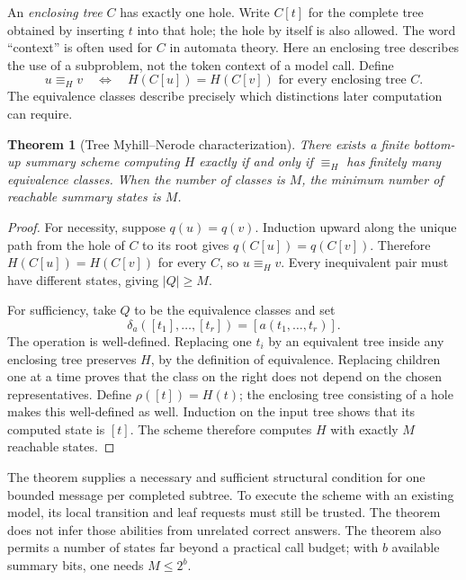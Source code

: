 \documentclass[11pt,twoside]{article}
\newtheorem{theorem}{Theorem}[section]
\theoremstyle{definition}
\theoremstyle{remark}
\begin{document}
An \emph{enclosing tree} $C$ has exactly one hole. Write $C[t]$ for the
complete tree obtained by inserting $t$ into that hole; the hole by itself
is also allowed. The word ``context'' is often used for $C$ in automata
theory. Here an enclosing tree describes the use of a subproblem, not the
token context of a model call. Define
\begin{equation}
 u\equiv_H v
 \quad\Longleftrightarrow\quad
 H(C[u])=H(C[v])\text{ for every enclosing tree }C.
 \label{eq:tree-equivalence}
\end{equation}
The equivalence classes describe precisely which distinctions later
computation can require.

\begin{theorem}[Tree Myhill--Nerode characterization]
\label{thm:tree-mn}
There exists a finite bottom-up summary scheme computing $H$ exactly if and only if
$\equiv_H$ has finitely many equivalence classes. When the number of
classes is $M$, the minimum number of reachable summary states is $M$.
\end{theorem}
\begin{proof}
For necessity, suppose $q(u)=q(v)$. Induction upward along the unique path
from the hole of $C$ to its root gives $q(C[u])=q(C[v])$. Therefore
$H(C[u])=H(C[v])$ for every $C$, so $u\equiv_H v$.
Every inequivalent pair must have different states, giving $|Q|\geq M$.

For sufficiency, take $Q$ to be the equivalence classes and set
\begin{equation}
 \delta_a([t_1],\ldots,[t_r])=[a(t_1,\ldots,t_r)].
 \label{eq:quotient-combine}
\end{equation}
The operation is well-defined. Replacing one $t_i$ by an equivalent tree
inside any enclosing tree preserves $H$, by the definition of equivalence.
Replacing children one at a time proves that the class on the right does
not depend on the chosen representatives. Define $\rho([t])=H(t)$; the
enclosing tree consisting of a hole makes this well-defined as well.
Induction on the input tree shows that its computed state is $[t]$.
The scheme therefore computes $H$ with exactly $M$ reachable states.
\end{proof}

The theorem supplies a necessary and sufficient structural condition for
one bounded message per completed subtree. To execute the scheme with an
existing model, its local transition and leaf requests must still be
trusted. The theorem does not infer those abilities from unrelated correct
answers. The theorem also permits a number of states far beyond a practical call
budget; with $b$ available summary bits, one needs $M\leq2^b$.
\end{document}
